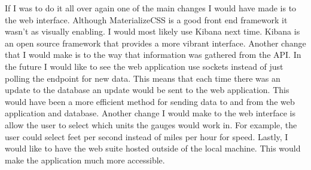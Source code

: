 \documentclass[onecolumn, draftclsnofoot,10pt, compsoc]{IEEEtran}
\begin{document}
If I was to do it all over again one of the main changes I would have made is to the web interface. Although MaterializeCSS is a good front end framework it wasn’t as visually enabling. I would most likely use Kibana next time. Kibana is an open source framework that provides a more vibrant interface. Another change that I would make is to the way that information was gathered from the API. In the future I would like to see the web application use sockets instead of just polling the endpoint for new data. This means that each time there was an update to the database an update would be sent to the web application. This would have been a more efficient method for sending data to and from the web application and database. Another change I would make to the web interface is allow the user to select which units the gauges would work in. For example, the user could select feet per second instead of miles per hour for speed. Lastly, I would like to have the web suite hosted outside of the local machine. This would make the application much more accessible. \par
\end{document}
